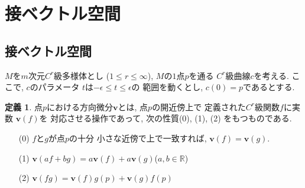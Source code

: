 \documentclass[a4j,12pt]{jarticle}
\theoremstyle{definition}
\newtheorem{definition}[theorem]{定義}
\begin{document}
\section{接ベクトル空間}
\subsection{接ベクトル空間}
$M$を$m$次元$C^r$級多様体とし 
($1\leq r\leq \infty$), $M$の$1$点$p$を通る
$C^r$級曲線$c$を考える. ここで, $c$のパラメータ
$t$は$-\epsilon \leq t\leq \epsilon$の
範囲を動くとし, $c(0)=p$であるとする. 
\begin{definition}\label{def:directional derivative}
    点$p$における方向微分$\boldsymbol{v}$とは, 
    点$p$の開近傍上で
    定義された$C^r$級関数$f$に実数
    $\boldsymbol{v}(f)$を
    対応させる操作であって, 次の性質(0), (1), (2)
    をもつものである. 
    \begin{itemize}
        \item[(0)]$f$と$g$が点$p$の十分
        小さな近傍で上で一致すれば, 
        $\boldsymbol{v}(f)=\boldsymbol{v}(g)$. 
        \item[(1)]$\boldsymbol{v}(af+bg)
        =a\boldsymbol{v}(f)+
        a\boldsymbol{v}(g)$($a,b\in \mathbb{R}$)
        \item[(2)]$\boldsymbol{v}(fg)=
        \boldsymbol{v}(f)g(p)+
        \boldsymbol{v}(g)f(p)$
    \end{itemize}
\end{definition}
\end{document}

